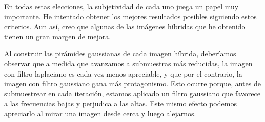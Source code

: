 \documentclass[10pt,a4paper]{article}
\begin{document}
En todas estas elecciones, la subjetividad de cada uno juega un papel muy importante. He intentado obtener los mejores resultados posibles siguiendo estos criterios. Aun así, creo que algunas de las imágenes híbridas que he obtenido tienen un gran margen de mejora.

Al construir las pirámides gaussianas de cada imagen híbrida, deberíamos observar que a medida que avanzamos a submuestras más reducidas, la imagen con filtro laplaciano es cada vez menos apreciable, y que por el contrario, la imagen con filtro gaussiano gana más protagonismo. Esto ocurre porque, antes de submuestrear en cada iteración, estamos aplicado un filtro gaussiano que favorece a las frecuencias bajas y perjudica a las altas. Este mismo efecto podemos apreciarlo al mirar una imagen desde cerca y luego alejarnos.
\end{document}
